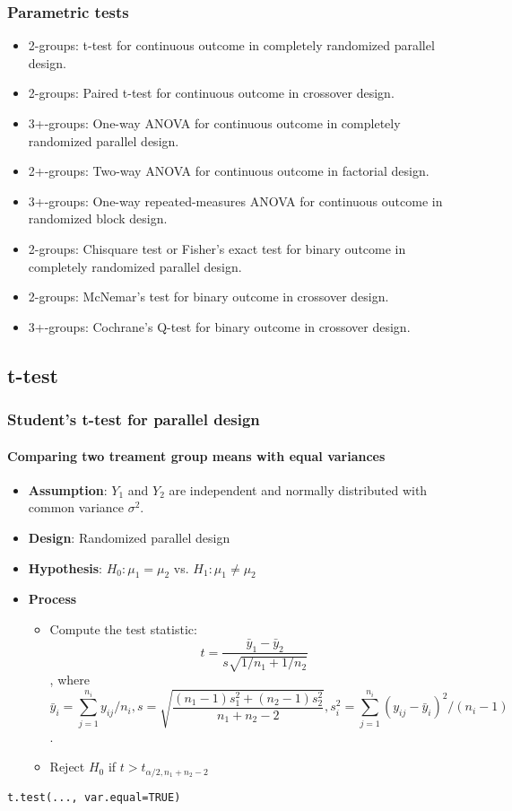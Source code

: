 \documentclass[table,10pt]{beamer}\usepackage[]{graphicx}\usepackage[]{color}
\begin{document}
\begin{CJK*}{UTF8}{gbsn}
\begin{frame}[t]
\frametitle{Parametric tests}
\begin{itemize}
	\item 2-groups: t-test for continuous outcome in completely randomized 
		parallel design.
	\item 2-groups: Paired t-test for continuous outcome in crossover design.
	\item 3+-groups: One-way ANOVA for continuous outcome in completely 
		randomized parallel design.
	\item 2+-groups: Two-way ANOVA for continuous outcome in factorial design.
	\item 3+-groups: One-way repeated-measures ANOVA for continuous outcome 
		in randomized block design.
	\item 2-groups: Chisquare test or Fisher's exact test for binary outcome in 
		completely randomized parallel design.
	\item 2-groups: McNemar's test for binary outcome in crossover design.
	\item 3+-groups: Cochrane's Q-test for binary outcome in crossover design.
\end{itemize}
\end{frame}

\subsection{t-test}

\begin{frame}[t, containsverbatim]
\frametitle{Student's t-test for parallel design}
\framesubtitle{Comparing two treament group means with equal variances}
\begin{itemize}
	\item \textbf{Assumption}: $Y_1$ and $Y_2$ are independent 
		and normally distributed with common variance 
		$\sigma^2$.
	\item \textbf{Design}: Randomized parallel design
	\item \textbf{Hypothesis}: $H_0: \mu_1 = \mu_2$ vs. $H_1: \mu_1 \neq \mu_2$
	\item \textbf{Process}
	\begin{itemize}	
		\item Compute the test statistic: 
		$$t = \frac{\bar{y}_1 - \bar{y}_2}{s\sqrt{1/n_1 + 1/n_2}}$$, 
		where
		$$
		\bar{y}_i = \sum_{j=1}^{n_i} y_{ij}/n_i, s = \sqrt{\frac{(n_1-1)s_1^2 + (n_2-1)s_2^2}{n_1+n_2-2}}, 
		s_i^2 = \sum_{j=1}^{n_i} (y_{ij} - \bar{y}_i)^2/(n_i - 1)$$.
		\item Reject $H_0$ if $t > t_{\alpha/2,n_1+n_2-2}$
	\end{itemize}
\end{itemize}
\begin{lstlisting}
t.test(..., var.equal=TRUE)
\end{lstlisting}
\end{frame}


\end{CJK*}
\end{document}
